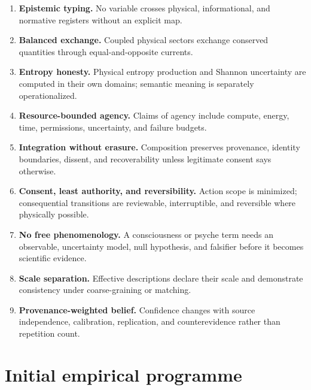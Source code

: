 \documentclass[11pt]{article}
\begin{document}
\begin{enumerate}[label=L\arabic*.,leftmargin=0.55in]
\item \textbf{Epistemic typing.} No variable crosses physical, informational, and normative registers without an explicit map.
\item \textbf{Balanced exchange.} Coupled physical sectors exchange conserved quantities through equal-and-opposite currents.
\item \textbf{Entropy honesty.} Physical entropy production and Shannon uncertainty are computed in their own domains; semantic meaning is separately operationalized.
\item \textbf{Resource-bounded agency.} Claims of agency include compute, energy, time, permissions, uncertainty, and failure budgets.
\item \textbf{Integration without erasure.} Composition preserves provenance, identity boundaries, dissent, and recoverability unless legitimate consent says otherwise.
\item \textbf{Consent, least authority, and reversibility.} Action scope is minimized; consequential transitions are reviewable, interruptible, and reversible where physically possible.
\item \textbf{No free phenomenology.} A consciousness or psyche term needs an observable, uncertainty model, null hypothesis, and falsifier before it becomes scientific evidence.
\item \textbf{Scale separation.} Effective descriptions declare their scale and demonstrate consistency under coarse-graining or matching.
\item \textbf{Provenance-weighted belief.} Confidence changes with source independence, calibration, replication, and counterevidence rather than repetition count.
\end{enumerate}

\section{Initial empirical programme}
\end{document}
